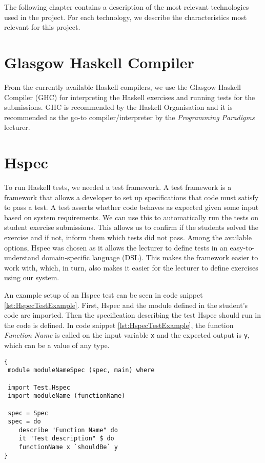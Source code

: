 The following chapter contains a description of the most relevant technologies used in the project. For each technology, we describe the characteristics most relevant for this project.

\section{Glasgow Haskell Compiler}
From the currently available Haskell compilers, we use the Glasgow Haskell Compiler (GHC) for interpreting the Haskell exercises and running tests for the submissions. GHC is recommended by the Haskell Organisation and it is recommended as the go-to compiler/interpreter by the \textit{Programming Paradigms} lecturer\cite{Haskell_GHC}.


\section{Hspec}
To run Haskell tests, we needed a test framework. A test framework is a framework that allows a developer to set up specifications that code must satisfy to pass a test.
A test asserts whether code behaves as expected given some input based on system requirements.
We can use this to automatically run the tests on student exercise submissions.
This allows us to confirm if the students solved the exercise and if not, inform them which tests did not pass.
Among the available options, Hspec was chosen as it allows the lecturer to define tests in an easy-to-understand domain-specific language (DSL).
This makes the framework easier to work with, which, in turn, also makes it easier for the lecturer to define exercises using our system.\cite{Hspec_landing}

An example setup of an Hspec test can be seen in code snippet \ref{lst:HspecTestExample}. First, Hspec and the module defined in the student's code are imported. Then the specification describing the test Hspec should run in the code is defined. In code snippet \ref{lst:HspecTestExample}, the function \textit{Function Name} is called on the input variable \texttt{x} and the expected output is \texttt{y}, which can be a value of any type.


\begin{lstlisting}[language=CSharp, caption={An example of a Hspec test}, label={lst:HspecTestExample}]
{
 module moduleNameSpec (spec, main) where

 import Test.Hspec
 import moduleName (functionName)

 spec = Spec
 spec = do
 	describe "Function Name" do
 	it "Test description" $ do
	functionName x `shouldBe` y
}
\end{lstlisting}

